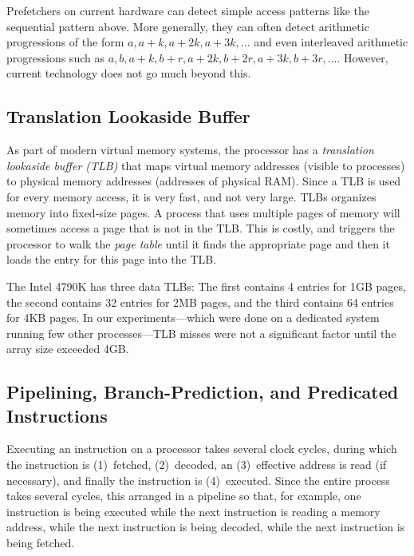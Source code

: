 \documentclass{patmorin}
\begin{document}
Prefetchers on current hardware can detect simple access patterns
like the sequential pattern above.  More generally, they can often
detect arithmetic progressions of the form $a,a+k,a+2k,a+3k,\ldots$
and even interleaved arithmetic progressions such as $a, b, a+k, b+r,
a+2k,b+2r,a+3k,b+3r,\ldots$.  However, current technology does not go
much beyond this.

\subsection{Translation Lookaside Buffer}

As part of modern virtual memory systems, the processor has a
\emph{translation lookaside buffer (TLB)} that maps virtual memory
addresses (visible to processes) to physical memory addresses (addresses
of physical RAM).  Since a TLB is used for every memory access, it is very
fast, and not very large.  TLBs organizes memory into fixed-size pages.
A process that uses multiple pages of memory will sometimes access a
page that is not in the TLB. This is costly, and triggers the processor
to walk the \emph{page table} until it finds the appropriate page and
then it loads the entry for this page into the TLB.

The Intel 4790K has three data TLBs: The first contains 4 entries for
1GB pages, the second contains 32 entries for 2MB pages, and the third
contains 64 entries for 4KB pages.  In our experiments---which were done
on a dedicated system running few other processes---TLB misses were not
a significant factor until the array size exceeded 4GB.



\subsection{Pipelining, Branch-Prediction, and Predicated Instructions}

Executing an instruction on a processor takes several clock cycles, during
which the instruction is (1)~fetched, (2)~decoded, an (3)~effective
address is read (if necessary), and finally the instruction is
(4)~executed.  Since the entire process takes several cycles, this
arranged in a pipeline so that, for example, one instruction is being
executed while the next instruction is reading a memory address, while
the next instruction is being decoded, while the next instruction is
being fetched.
\end{document}
